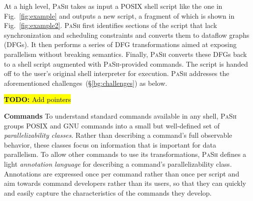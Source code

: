\documentclass[sigplan, review, screen, anonymous]{acmart}
\newcommand{\heading}[1]{\vspace{4pt}\noindent\textbf{#1}\enspace}
\newcommand{\TODO}[1]{\hl{\textbf{TODO:} #1}\xspace}
\newcommand{\kk}[1]{[{\color{magenta}kk: #1}]}
\newcommand{\sx}[1]{(\S\ref{#1})}
\newcommand{\sys}{{\scshape PaSh}\xspace}
\begin{document}
At a high level, \sys takes as input a POSIX shell script like the one in Fig.~\ref{fig:example} and outputs a new script, a fragment of which is shown in Fig.~\ref{fig:example2}.
% 
\sys first identifies sections of the script that lack synchronization and scheduling constraints and converts them to dataflow graphs (DFGs).
It then performs a series of DFG transformations aimed at exposing parallelism without breaking semantics. %
Finally, \sys converts these DFGs back to a shell script augmented with \sys-provided commands. %
The script is handed off to the user's original shell interpreter for execution.
\sys addresses the aforementioned challenges~\sx{bg:challenges} as below.

\TODO{Add pointers}

\heading{Commands}
To understand standard commands available in any shell, \sys groups POSIX and GNU commands into a small but well-defined set of \emph{parallelizability classes}.
Rather than describing a command's full observable behavior, these classes focus on information that is important for data parallelism.
To allow other commands to use its transformations, \sys defines a light \emph{annotation language} for describing a command's parallelizability class.
Annotations are expressed once per command rather than once per script and aim towards command developers rather than its users, so that they can quickly and easily capture the characteristics of the commands they develop.
\end{document}
